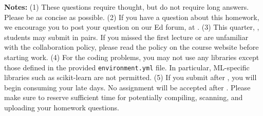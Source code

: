 {\bf Notes:} 
(1) These questions require thought, but do not require long answers. Please be as concise as possible.  
(2) If you have a question
about this homework, we encourage you to post your question on our
Ed forum, at \ed. 
(3) This quarter, \qtr, students may submit in pairs. If you missed the first lecture or are unfamiliar with the collaboration policy, please read the policy on the course website before starting work.
(4) For the coding problems, you may not use any libraries except those defined in the provided \texttt{environment.yml} file. In particular, ML-specific libraries such as scikit-learn are not permitted. 
(5) If you submit after \due, you will begin consuming your late days. No assignment will be accepted after \latedue. Please make sure to reserve sufficient time for potentially compiling, scanning, and uploading your homework questions.